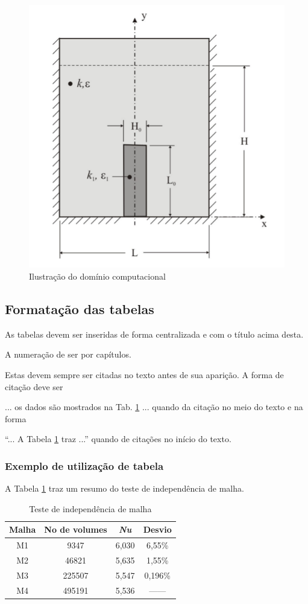 \documentclass[a4paper,12pt,oneside]{article}
\numberwithin{equation}{section}
\begin{document}
\begin{figure}[h]
\centering
\includegraphics[width=.7\linewidth]{img/dominio}
\caption{Ilustração do domínio computacional}
\label{figExemplo}
\end{figure}
	
	

\subsection{Formatação das tabelas}

As tabelas devem ser inseridas de forma centralizada e com o título acima desta.

A numeração de ser por capítulos.

Estas devem sempre ser citadas no texto antes de sua aparição. A forma de citação deve ser

... os dados são mostrados na Tab. \ref{tabExemplo} ... quando da citação no meio do texto e na forma 

“... A Tabela \ref{tabExemplo} traz ...” quando de citações no início do texto.

\subsubsection{Exemplo de utilização de tabela}

A Tabela \ref{tabExemplo} traz um resumo do teste de independência de malha.

\begin{table}[h!]
\begin{center}
	\caption{Teste de independência de malha}
	\begin{tabular}{c|c|c|c} \hline
		\textbf{Malha} & \textbf{No de volumes} & \textbf{\textit{Nu}} & \textbf{Desvio} \\ \hline
		M1 & 9347 		& 6,030	 & 6,55\% \\ 
		M2 & 46821 		& 5,635	 & 1,55\% \\
		M3 & 225507		& 5,547	 & 0,196\% \\
		M4 & 495191		& 5,536	 & ------ \\ \hline
	\end{tabular}
	\label{tabExemplo}
\end{center}
\end{table}
\end{document}
